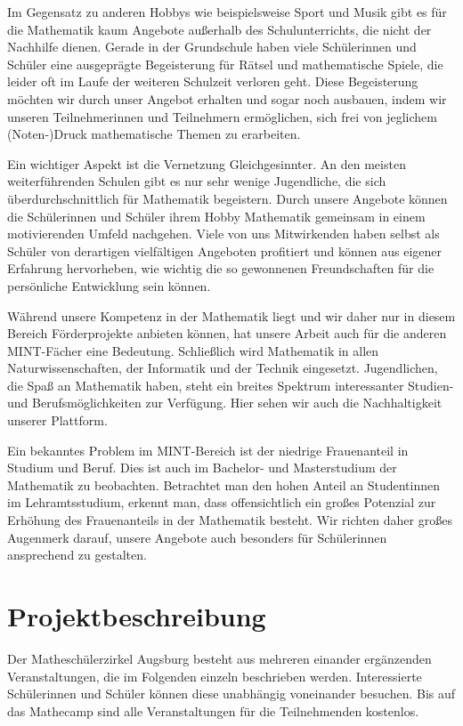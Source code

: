 \documentclass[12pt]{zettel}
\begin{document}
Im Gegensatz zu anderen Hobbys wie beispielsweise Sport und Musik gibt es für die Mathematik kaum Angebote außerhalb des Schulunterrichts, die nicht der Nachhilfe dienen. Gerade in der Grundschule haben viele Schülerinnen und Schüler eine ausgeprägte Begeisterung für
Rätsel und mathematische Spiele, die leider oft im Laufe der weiteren
Schulzeit verloren geht. Diese Begeisterung möchten wir
durch unser Angebot erhalten und sogar noch ausbauen, indem wir
unseren Teilnehmerinnen und Teilnehmern ermöglichen, sich frei von jeglichem
(Noten-)Druck mathematische Themen zu erarbeiten.

Ein wichtiger Aspekt ist die Vernetzung Gleichgesinnter. An
den meisten weiterführenden Schulen gibt es nur sehr wenige Jugendliche, die sich überdurchschnittlich für Mathematik begeistern. Durch unsere Angebote können die
Schülerinnen und Schüler ihrem Hobby Mathematik gemeinsam in einem motivierenden Umfeld nachgehen.  Viele von uns Mitwirkenden haben selbst als Schüler von derartigen vielfältigen Angeboten profitiert und können aus eigener Erfahrung hervorheben, wie wichtig die so gewonnenen Freundschaften für die persönliche Entwicklung sein können.

Während unsere Kompetenz in der Mathematik liegt und wir daher nur in diesem Bereich Förderprojekte anbieten können, hat unsere Arbeit auch für die anderen MINT-Fächer eine Bedeutung. Schließlich wird Mathematik in allen Naturwissenschaften, der Informatik und der Technik eingesetzt. Jugendlichen, die Spaß an Mathematik haben, steht ein breites Spektrum interessanter Studien- und Berufsmöglichkeiten zur Verfügung. Hier sehen wir auch die Nachhaltigkeit unserer Plattform.

Ein bekanntes Problem im MINT-Bereich ist der niedrige Frauenanteil in Studium und Beruf. Dies ist auch im Bachelor- und Masterstudium der Mathematik zu beobachten. Betrachtet man den hohen Anteil an Studentinnen im Lehramtsstudium, erkennt man, dass offensichtlich ein großes Potenzial zur Erhöhung des Frauenanteils in der Mathematik besteht. Wir richten daher großes Augenmerk darauf, unsere Angebote auch besonders für Schülerinnen ansprechend zu gestalten.

\section{Projektbeschreibung}

Der Matheschülerzirkel Augsburg besteht aus mehreren einander ergänzenden Veranstaltungen, die im
Folgenden einzeln beschrieben werden. Interessierte Schülerinnen und Schüler
können diese unabhängig voneinander besuchen. Bis auf das Mathecamp sind alle
Veranstaltungen für die Teilnehmenden kostenlos.
\end{document}
